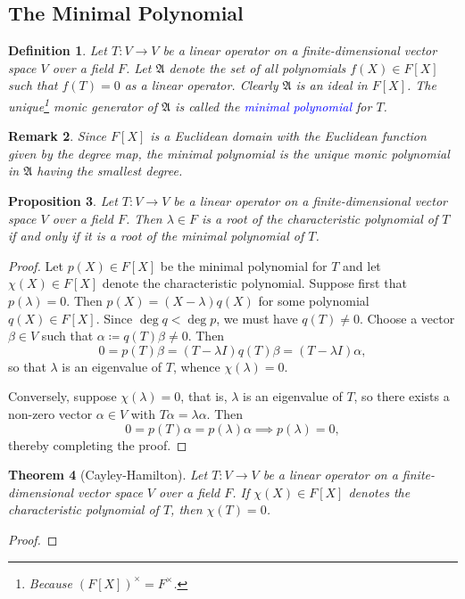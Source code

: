 \documentclass[11pt]{article}
\theoremstyle{thmstyle}
\newtheorem{theorem}{Theorem}[section]
\newtheorem{proposition}[theorem]{Proposition}
\theoremstyle{defstyle}
\newtheorem{definition}[theorem]{Definition}
\newtheorem{remark}[theorem]{Remark}
\newcommand{\frakA}{\mathfrak{A}}
\newcommand{\define}[1]{\textcolor{blue}{\textit{#1}}}
\begin{document}
\subsection{The Minimal Polynomial}

\begin{definition}
    Let $T\colon V\to V$ be a linear operator on a finite-dimensional vector space $V$ over a field $F$. Let $\frakA$ denote the set of all polynomials $f(X)\in F[X]$ such that $f(T) = 0$ as a linear operator. Clearly $\frakA$ is an ideal in $F[X]$. The unique\footnote{Because $(F[X])^\times = F^\times$.} monic generator of $\frakA$ is called the \define{minimal polynomial} for $T$.
\end{definition}

\begin{remark}
    Since $F[X]$ is a Euclidean domain with the Euclidean function given by the degree map, the minimal polynomial is the unique monic polynomial in $\frakA$ having the smallest degree.
\end{remark}

\begin{proposition}
    Let $T\colon V\to V$ be a linear operator on a finite-dimensional vector space $V$ over a field $F$. Then $\lambda\in F$ is a root of the characteristic polynomial of $T$ if and only if it is a root of the minimal polynomial of $T$.
\end{proposition}
\begin{proof}
    Let $p(X)\in F[X]$ be the minimal polynomial for $T$ and let $\chi(X)\in F[X]$ denote the characteristic polynomial. Suppose first that $p(\lambda) = 0$. Then $p(X) = (X - \lambda)q(X)$ for some polynomial $q(X)\in F[X]$. Since $\deg q < \deg p$, we must have $q(T)\ne 0$. Choose a vector $\beta\in V$ such that $\alpha\coloneq q(T)\beta\ne 0$. Then 
    \begin{equation*}
        0 = p(T)\beta = (T - \lambda I)q(T)\beta = (T - \lambda I)\alpha,
    \end{equation*}
    so that $\lambda$ is an eigenvalue of $T$, whence $\chi(\lambda) = 0$.

    Conversely, suppose $\chi(\lambda) = 0$, that is, $\lambda$ is an eigenvalue of $T$, so there exists a non-zero vector $\alpha\in V$ with $T\alpha = \lambda\alpha$. Then 
    \begin{equation*}
        0 = p(T)\alpha = p(\lambda)\alpha\implies p(\lambda) = 0,
    \end{equation*}
    thereby completing the proof.
\end{proof}

\begin{theorem}[Cayley-Hamilton]
    Let $T\colon V\to V$ be a linear operator on a finite-dimensional vector space $V$ over a field $F$. If $\chi(X)\in F[X]$ denotes the characteristic polynomial of $T$, then $\chi(T) = 0$.
\end{theorem}
\begin{proof}
\end{proof}

 
\end{document}
